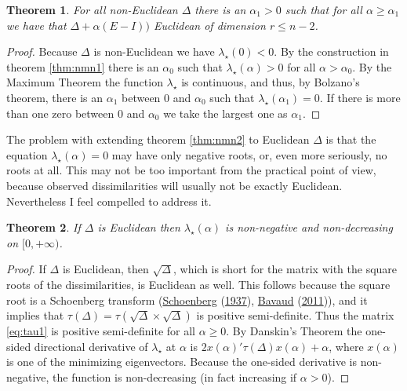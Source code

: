 \documentclass[
  12pt,
]{book}
\newtheorem{theorem}{Theorem}[chapter]
\theoremstyle{definition}
\theoremstyle{definition}
\theoremstyle{definition}
\theoremstyle{definition}
\theoremstyle{remark}
\begin{document}
\begin{theorem}
\protect\hypertarget{thm:nmn2}{}{\label{thm:nmn2} }For all non-Euclidean \(\Delta\) there is an \(\alpha_1>0\) such that for all \(\alpha\geq\alpha_1\) we have that \(\Delta+\alpha(E-I))\) Euclidean of dimension \(r\leq n-2\).
\end{theorem}

\begin{proof}
Because \(\Delta\) is non-Euclidean we have \(\lambda_\star(0)<0\). By the construction in theorem \ref{thm:nmn1} there is an \(\alpha_0\) such that
\(\lambda_\star(\alpha)>0\) for all \(\alpha>\alpha_0\). By the Maximum Theorem
the function \(\lambda_\star\) is continuous, and thus, by Bolzano's theorem, there is an \(\alpha_1\) between \(0\) and \(\alpha_0\) such that \(\lambda_\star(\alpha_1)=0\). If there is more than one zero between
\(0\) and \(\alpha_0\) we take the largest one as \(\alpha_1\).
\end{proof}

The problem with extending theorem \ref{thm:nmn2} to Euclidean \(\Delta\) is that the equation \(\lambda_\star(\alpha)=0\) may have only negative roots, or, even more seriously, no roots at all. This may not be too important from the practical point of view, because observed dissimilarities will usually not be exactly Euclidean. Nevertheless I feel compelled to address it.

\begin{theorem}
\protect\hypertarget{thm:nmn3}{}{\label{thm:nmn3} }If \(\Delta\) is Euclidean then \(\lambda_\star(\alpha)\) is non-negative and non-decreasing on \([0,+\infty)\).
\end{theorem}

\begin{proof}
If \(\Delta\) is Euclidean, then \(\sqrt{\Delta}\), which is short for the matrix with the square roots of the dissimilarities, is Euclidean as well. This follows because the square root is a Schoenberg transform (\protect\hyperlink{ref-schoenberg_37}{Schoenberg} (\protect\hyperlink{ref-schoenberg_37}{1937}), \protect\hyperlink{ref-bavaud_11}{Bavaud} (\protect\hyperlink{ref-bavaud_11}{2011})), and it implies that \(\tau(\Delta)=\tau(\sqrt{\Delta}\times\sqrt{\Delta})\) is positive semi-definite. Thus the matrix \eqref{eq:tau1} is positive semi-definite for all \(\alpha\geq 0\). By Danskin's Theorem the one-sided directional derivative of \(\lambda_\star\) at \(\alpha\) is \(2x(\alpha)'\tau(\Delta)x(\alpha)+\alpha\), where \(x(\alpha)\) is one of the minimizing eigenvectors. Because the one-sided derivative is non-negative, the function is non-decreasing (in fact increasing if \(\alpha>0\)).
\end{proof}
\end{document}
